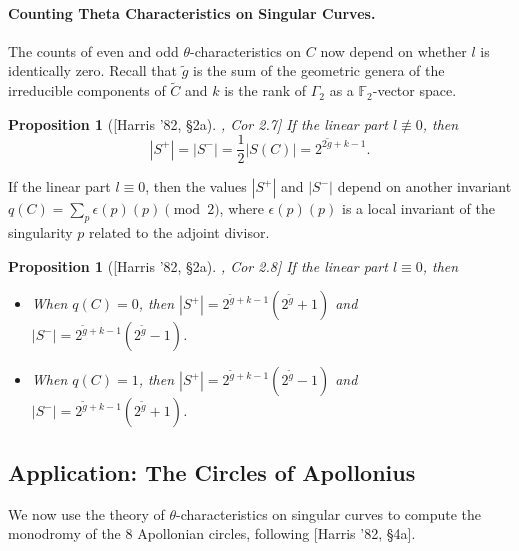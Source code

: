 \documentclass[11pt,a4paper]{article}
\newcommand{\gtilde}{\widetilde{g}}
\newcommand{\epsilonp}{\epsilon(p)}
\theoremstyle{mytheoremstyle}
\newtheorem{proposition}[theorem]{Proposition}
\theoremstyle{mydefinitionstyle}
\newcommand{\HarrisThetaCite}[1]{[Harris '82, \S#1]}
\begin{document}
\paragraph{Counting Theta Characteristics on Singular Curves.}
The counts of even and odd $\theta$-characteristics on $C$ now depend on whether $l$ is identically zero. Recall that $\gtilde$ is the sum of the geometric genera of the irreducible components of $\widetilde{C}$ and $k$ is the rank of $\Gamma_2$ as a $\mathbb{F}_2$-vector space.
\begin{proposition}[\HarrisThetaCite{2a}, Cor 2.7]
If the linear part $l \not\equiv 0$, then
\[ |S^+| = |S^-| = \frac{1}{2}|S(C)| = 2^{2\gtilde + k - 1}. \]
\end{proposition}
If the linear part $l \equiv 0$, then the values $|S^+|$ and $|S^-|$ depend on another invariant $q(C) = \sum_p \epsilonp(p) \pmod 2$, where $\epsilonp(p)$ is a local invariant of the singularity $p$ related to the adjoint divisor.
\begin{proposition}[\HarrisThetaCite{2a}, Cor 2.8] \label{prop: count theta}
If the linear part $l \equiv 0$, then
\begin{itemize}
    \item When $q(C)=0$, then $|S^+| = 2^{\gtilde+k-1}(2^{\gtilde}+1)$ and $|S^-| = 2^{\gtilde+k-1}(2^{\gtilde}-1)$.
    \item When $q(C)=1$, then $|S^+| = 2^{\gtilde+k-1}(2^{\gtilde}-1)$ and $|S^-| = 2^{\gtilde+k-1}(2^{\gtilde}+1)$.
\end{itemize}
\end{proposition}

\subsection{Application: The Circles of Apollonius}
We now use the theory of $\theta$-characteristics on singular curves to compute the monodromy of the $8$ Apollonian circles, following \HarrisThetaCite{4a}.

\newcommand{\cpm}{\circ_{\pm}}
\end{document}
